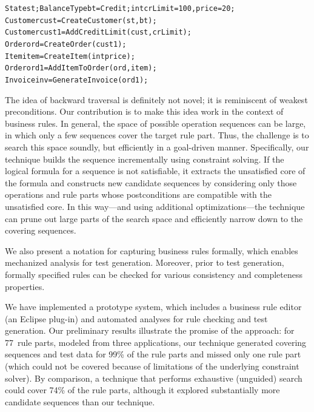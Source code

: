 \vspace*{-4pt}%
{\scriptsize
\begin{alltt}
 State st; BalanceType bt = Credit; int crLimit = 100, price = 20;
 Customer cust = CreateCustomer(st, bt);
 Customer cust1 = AddCreditLimit(cust, crLimit);
 Order ord = CreateOrder(cust1);
 Item item = CreateItem(int price);
 Order ord1 = AddItemToOrder(ord, item);
 Invoice inv = GenerateInvoice(ord1);  
\end{alltt}}%
\vspace*{-5pt}

The idea of backward traversal is definitely not novel; it is reminiscent of
weakest preconditions.  Our contribution is to make this idea work in the
context of business rules.  In general, the space of possible operation
sequences can be large, in which only a few sequences cover the target rule
part. Thus, the challenge is to search this space soundly, but efficiently in a
goal-driven manner. Specifically, our technique builds the sequence
incrementally using constraint solving. If the logical formula for a sequence is
not satisfiable, it extracts the unsatisfied core of the formula and constructs
new candidate sequences by considering only those operations and rule parts
whose postconditions are compatible with the unsatisfied core. In this way---and
using additional optimizations---the technique can prune out large parts of the
search space and efficiently narrow down to the covering sequences.

We also present a notation for capturing business rules formally, which enables
mechanized analysis for test generation. Moreover, prior to test generation,
formally specified rules can be checked for various consistency and completeness
properties.

We have implemented a prototype system, which includes a business rule editor
(an Eclipse plug-in) and automated analyses for rule checking and test
generation. Our preliminary results illustrate the promise of the approach: for
77~rule parts, modeled from three applications, our technique generated covering
sequences and test data for 99\% of the rule parts and missed only one rule part
(which could not be covered because of limitations of the underlying constraint
solver). By comparison, a technique that performs exhaustive (unguided) search
could cover 74\% of the rule parts, although it explored substantially more
candidate sequences than our technique.

